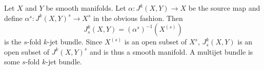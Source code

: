 Let $X$ and $Y$ be smooth manifolds. Let $\alpha: J^k(X, Y) \to X$ be the source map and define $\alpha^s: J^k(X, Y)^s \to X^s$ in the obvious fashion. Then
$$J_s^k(X, Y) = (\alpha^s)^{-1}(X^{(s)})$$
is the $s$-fold $k$-jet bundle. Since $X^{(s)}$ is an open subset of $X^s$, $J_s^k(X, Y)$ is an open subset of $J^k(X, Y)^s$ and is thus a smooth manifold. A multijet bundle is some $s$-fold $k$-jet bundle.
